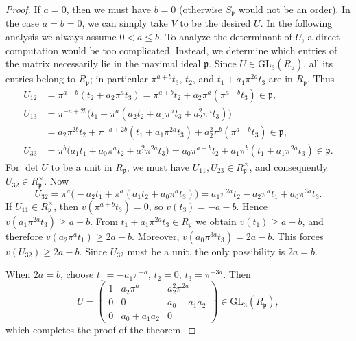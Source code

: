 \documentclass[12pt]{article}
\theoremstyle{plain}
\theoremstyle{definition}
\theoremstyle{remark}
\begin{document}
\begin{proof}
If $a=0$, then we must have $b=0$ (otherwise $S_\mathfrak{p}$ would not be an order). In the case $a=b=0$, we can simply take $V$ to be the desired $U$. In the following analysis we always assume $0<a\leq b$. To analyze the determinant of $U$, a direct computation would be too complicated. Instead, we determine which entries of the matrix necessarily lie in the maximal ideal $\mathfrak{p}$. Since $U\in \mathrm{GL}_3(R_\mathfrak{p})$, all its entries belong to $R_\mathfrak{p}$; in particular $\pi^{a+b}t_3$, $t_2$, and $t_1 + a_1\pi^{2a}t_3$ are in $R_\mathfrak{p}$. Thus
\begin{align*}
U_{12}&=\pi^{a+b}(t_2 + a_2 \pi^{a} t_3)
      =\pi^{a+b}t_2 + a_2\pi^a(\pi^{a+b}t_3)\in \mathfrak{p},\\
U_{13}&=\pi^{-a+2b}\bigl(t_1 + \pi^{a}(a_2 t_2 + a_1 \pi^{a} t_3 + a_2^2 \pi^{a} t_3)\bigr)\\
      &=a_2\pi^{2b}t_2 + \pi^{-a+2b}(t_1 + a_1 \pi^{2a} t_3) + a_2^2\pi^b(\pi^{a+b}t_3)\in \mathfrak{p},\\
U_{33}&=\pi^{b}\bigl(a_1 t_1 + a_0 \pi^{a} t_2 + a_1^2 \pi^{2a} t_3\bigr)
      =a_0\pi^{a+b}t_2 + a_1\pi^b(t_1 + a_1 \pi^{2a} t_3)\in \mathfrak{p}.
\end{align*}
For $\det U$ to be a unit in $R_\mathfrak{p}$, we must have $U_{11},U_{23}\in R_\mathfrak{p}^\times$, and consequently $U_{32}\in R_\mathfrak{p}^\times$.
Now
$$U_{32}=\pi^{a}\bigl(-a_2 t_1 + \pi^{a}(a_1 t_2 + a_0 \pi^{a} t_3)\bigr)
      =a_1\pi^{2a}t_2 - a_2\pi^a t_1 + a_0\pi^{3a}t_3.$$
If $U_{11}\in R_\mathfrak{p}^\times$, then $v(\pi^{a+b}t_3)=0$, so $v(t_3)=-a-b$. Hence $v(a_1\pi^{2a}t_3)\ge a-b$. From $t_1 + a_1\pi^{2a}t_3\in R_\mathfrak{p}$ we obtain $v(t_1)\ge a-b$, and therefore $v(a_2\pi^a t_1)\ge 2a-b$. Moreover, $v(a_0\pi^{3a}t_3)=2a-b$. This forces $v(U_{32})\ge 2a-b$. Since $U_{32}$ must be a unit, the only possibility is $2a=b$.

When $2a=b$, choose $t_1=-a_1\pi^{-a}$, $t_2=0$, $t_3=\pi^{-3a}$. Then
$$U=\begin{pmatrix}
1 & a_2 \pi^{a} & a_2^2 \pi^{2a} \\
0 & 0 & a_0 + a_1 a_2 \\
0 & a_0 + a_1 a_2 & 0
\end{pmatrix}\in \mathrm{GL}_3(R_\mathfrak{p}),$$
which completes the proof of the theorem.
\end{proof}
\end{document}
